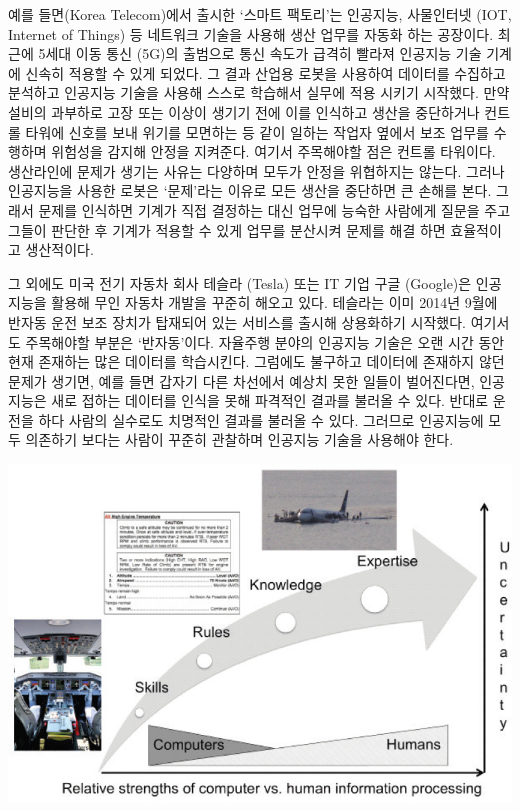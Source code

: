 \documentclass[smallextended]{svjour3}       %
\begin{document}
예를 들면(Korea Telecom)에서 출시한 `스마트 팩토리'는 인공지능,
사물인터넷 (IOT, Internet of Things) 등 네트워크 기술을 사용해 생산
업무를 자동화 하는 공장이다\cite{youngwoo_2018}. 최근에 5세대 이동 통신
(5G)의 출범으로 통신 속도가 급격히 빨라져 인공지능 기술 기계에 신속히
적용할 수 있게 되었다. 그 결과 산업용 로봇을 사용하여 데이터를 수집하고
분석하고 인공지능 기술을 사용해 스스로 학습해서 실무에 적용 시키기
시작했다. 만약 설비의 과부하로 고장 또는 이상이 생기기 전에 이를
인식하고 생산을 중단하거나 컨트롤 타워에 신호를 보내 위기를 모면하는 등
같이 일하는 작업자 옆에서 보조 업무를 수행하며 위험성을 감지해 안정을
지켜준다. 여기서 주목해야할 점은 컨트롤 타워이다. 생산라인에 문제가
생기는 사유는 다양하며 모두가 안정을 위협하지는 않는다. 그러나
인공지능을 사용한 로봇은 `문제'라는 이유로 모든 생산을 중단하면 큰
손해를 본다. 그래서 문제를 인식하면 기계가 직접 결정하는 대신 업무에
능숙한 사람에게 질문을 주고 그들이 판단한 후 기계가 적용할 수 있게
업무를 분산시켜 문제를 해결 하면 효율적이고 생산적이다.

그 외에도 미국 전기 자동차 회사 테슬라 (Tesla) 또는 IT 기업 구글
(Google)은 인공지능을 활용해 무인 자동차 개발을 꾸준히 해오고 있다.
테슬라는 이미 2014년 9월에 반자동 운전 보조 장치가 탑재되어 있는
서비스를 출시해 상용화하기 시작했다. 여기서도 주목해야할 부분은
`반자동'이다. 자율주행 분야의 인공지능 기술은 오랜 시간 동안 현재
존재하는 많은 데이터를 학습시킨다. 그럼에도 불구하고 데이터에 존재하지
않던 문제가 생기면, 예를 들면 갑자기 다른 차선에서 예상치 못한 일들이
벌어진다면, 인공지능은 새로 접하는 데이터를 인식을 못해 파격적인 결과를
불러올 수 있다. 반대로 운전을 하다 사람의 실수로도 치명적인 결과를
불러올 수 있다. 그러므로 인공지능에 모두 의존하기 보다는 사람이 꾸준히
관찰하며 인공지능 기술을 사용해야 한다.

\begin{center}\includegraphics[width=0.77\linewidth]{fig/role-allocation-skill-rules-experties} \end{center}
\end{document}

